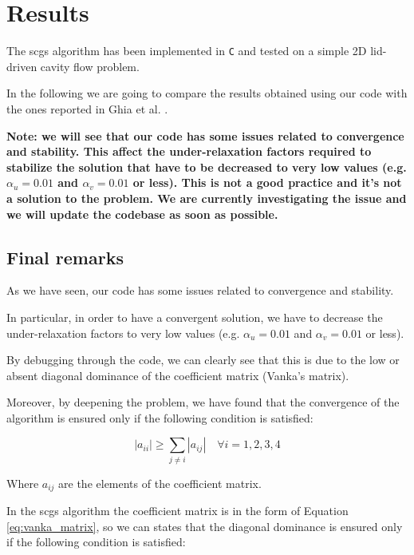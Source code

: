 \section{Results}
\label{sec:results}

The \acrshort{scgs} algorithm has been implemented in \texttt{C} and tested on a simple 2D lid-driven cavity flow problem.

In the following we are going to compare the results obtained using our code with the ones reported in Ghia et al. \cite{Ghia1982HighReSF}.

\textbf{
    Note: we will see that our code has some issues related to convergence and stability.
    This affect the under-relaxation factors required to stabilize the solution that have to be decreased to very low values (e.g. $\alpha_u = 0.01$ and $\alpha_v = 0.01$ or less).
    This is not a good practice and it's not a solution to the problem. We are currently investigating the issue and we will update the codebase as soon as possible.
}







\subsection{Final remarks}

As we have seen, our code has some issues related to convergence and stability.

In particular, in order to have a convergent solution, we have to decrease the under-relaxation factors to very low values (e.g. $\alpha_u = 0.01$ and $\alpha_v = 0.01$ or less).

By debugging through the code, we can clearly see that this is due to the low or absent diagonal dominance of the coefficient matrix (Vanka's matrix).

Moreover, by deepening the problem, we have found that the convergence of the algorithm is ensured only if the following condition is satisfied:

\begin{equation}
    |a_{ii}| \geq \sum_{j \neq i} |a_{ij}| \quad \forall i = 1, 2, 3, 4
    \label{eq:diagonal_dominance}
\end{equation}

Where $a_{ij}$ are the elements of the coefficient matrix.

In the \acrshort{scgs} algorithm the coefficient matrix is in the form of Equation \ref{eq:vanka_matrix}, so we can states that the diagonal dominance is ensured only if the following condition is satisfied:

